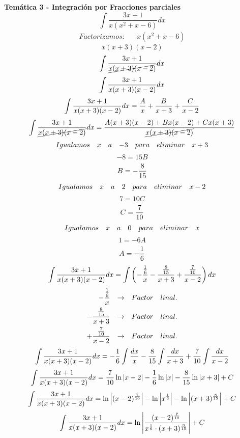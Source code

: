 






\textbf{Temática 3 - Integración por Fracciones parciales}
\[\int\frac{3x+1}{x(x^2+x-6)}dx\]
\[
    \begin{aligned}
        Factorizamos: && x(x^2+x-6)
    \end{aligned}
\]
\[x(x+3)(x-2)\]
\[\fracexpretion{1}\]
\[\fracexpretion{0}\]
\[\fracexpretion{0}=\frac{A}{\fexpression}+\frac{B}{\sexpression}+\frac{C}{\texpression}\]
\[\fracexpretion{1}=\frac{A(\sexpression)(\texpression)+B\fexpression(\texpression)+C\fexpression(\sexpression)}{\drwdenominator{1}}\]
\[
    \begin{aligned}
        Igualamos && x && a && -3 && para && eliminar && x+3
    \end{aligned}
\]
\[-8=15B\]
\[B=\fracb{1}\]
\[
    \begin{aligned}
        Igualamos && x && a && 2 && para && eliminar && x-2
    \end{aligned}
\]
\[7=10C\]
\[C=\frac{7}{10}\]
\[
    \begin{aligned}
        Igualamos && x && a && 0 && para && eliminar && x
    \end{aligned}
\]
\[1=-6A\]
\[A=\fraca{1}\]
\[\fracexpretion{0}=\int\left(\drawffraction\drawsfraction\drawtfraction\right)dx\]
\[
    \begin{aligned}
       \drawffraction && \rightarrow && Factor && linal. \\
       \drawsfraction && \rightarrow && Factor && linal. \\
       \drawtfraction && \rightarrow && Factor && linal.
    \end{aligned}
\]
\[\fracexpretion{0}=\fraca{1}\int\frac{dx}{\fexpression}\fracb{1}\int\frac{dx}{\sexpression}+\fracc\int\frac{dx}{\texpression}\]
\[\fracexpretion{0}=\fracc\ln\left|\texpression\right|\fraca{1}\ln\left|\fexpression\right|\fracb{1}\ln\left|\sexpression\right|+C\]
\[\fracexpretion{0}=\ln\left|\drawtexpression\right|-\ln\left|\drawfexpression\right|-\ln\left|\drawsexpression\right|+C\]
\[\fracexpretion{0}=\ln\left|\frac{\drawtexpression}{\drawfexpression\cdot\drawsexpression}\right|+C\]